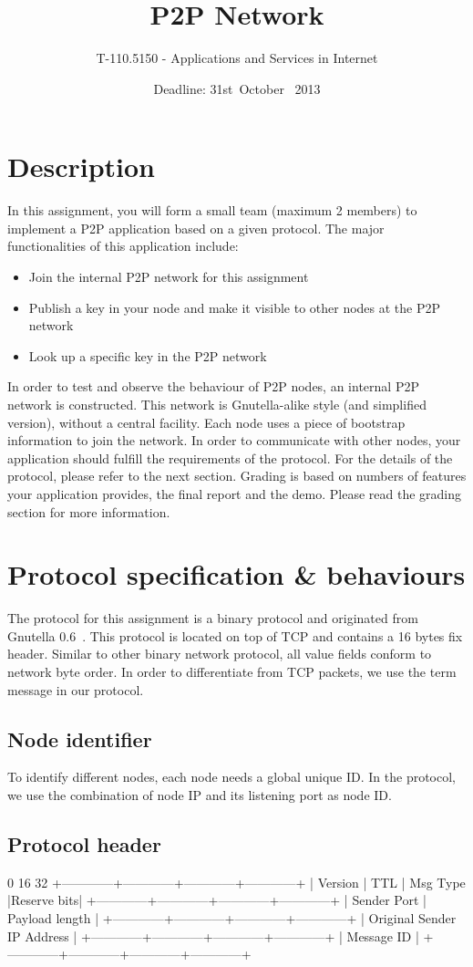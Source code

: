 \documentclass[12pt, a4paper]{article}
\date{Deadline: 31st\ October \ 2013}
\title{P2P Network}
\author{T-110.5150 - Applications and Services in Internet}
\begin{document}
\maketitle
\section{Description}
In this assignment, you will form a small team (maximum 2 members) to implement a P2P application based on a given protocol. The major functionalities of this application include:
\begin{itemize}
\item Join the internal P2P network for this assignment
\item Publish a key in your node and make it visible to other nodes at the P2P network
\item Look up a specific key in the P2P network
\end{itemize}
In order to test and observe the behaviour of P2P nodes, an internal P2P network is constructed. This network is Gnutella-alike style (and simplified version), without a central facility. Each node uses a piece of bootstrap information to join the network. In order to communicate with other nodes, your application should fulfill the requirements of the protocol. For the details of the protocol, please refer to the next section. Grading is based on numbers of features your application provides, the final report and the demo. Please read the grading section for more information.
\section{Protocol specification \& behaviours}
The protocol for this assignment is a binary protocol and originated from Gnutella 0.6~\cite{gnutella}. This protocol is located on top of TCP and contains a 16 bytes fix header. Similar to other binary network protocol, all value fields conform to network byte order. In order to differentiate from TCP packets, we use the term message in our protocol.

\subsection{Node identifier}
To identify different nodes, each node needs a global unique ID. In the protocol, we use the combination of node IP and its listening port as node ID.
\subsection{Protocol header}
\begin{verbbox}
0                          16                        32
+------------+------------+------------+------------+
|  Version   |     TTL    | Msg Type   |Reserve bits|
+------------+------------+------------+------------+
|       Sender Port       |       Payload length    |
+------------+------------+------------+------------+
|            Original Sender IP Address             |
+------------+------------+------------+------------+
|                     Message ID                    |
+------------+------------+------------+------------+
\end{verbbox}
\end{document}
